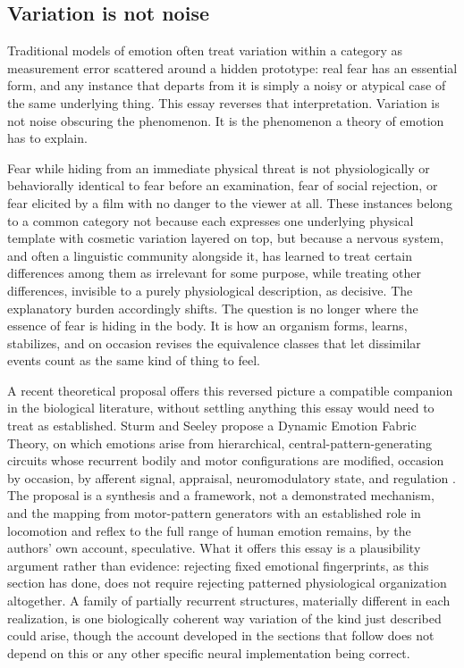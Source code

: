 \documentclass[11pt]{article}
\begin{document}
\subsection{Variation is not noise}

Traditional models of emotion often treat variation within a category as measurement error scattered around a hidden prototype: real fear has an essential form, and any instance that departs from it is simply a noisy or atypical case of the same underlying thing. This essay reverses that interpretation. Variation is not noise obscuring the phenomenon. It is the phenomenon a theory of emotion has to explain.

Fear while hiding from an immediate physical threat is not physiologically or behaviorally identical to fear before an examination, fear of social rejection, or fear elicited by a film with no danger to the viewer at all. These instances belong to a common category not because each expresses one underlying physical template with cosmetic variation layered on top, but because a nervous system, and often a linguistic community alongside it, has learned to treat certain differences among them as irrelevant for some purpose, while treating other differences, invisible to a purely physiological description, as decisive. The explanatory burden accordingly shifts. The question is no longer where the essence of fear is hiding in the body. It is how an organism forms, learns, stabilizes, and on occasion revises the equivalence classes that let dissimilar events count as the same kind of thing to feel.

A recent theoretical proposal offers this reversed picture a compatible companion in the biological literature, without settling anything this essay would need to treat as established. Sturm and Seeley propose a Dynamic Emotion Fabric Theory, on which emotions arise from hierarchical, central-pattern-generating circuits whose recurrent bodily and motor configurations are modified, occasion by occasion, by afferent signal, appraisal, neuromodulatory state, and regulation \citep{SturmSeeley2026}. The proposal is a synthesis and a framework, not a demonstrated mechanism, and the mapping from motor-pattern generators with an established role in locomotion and reflex to the full range of human emotion remains, by the authors' own account, speculative. What it offers this essay is a plausibility argument rather than evidence: rejecting fixed emotional fingerprints, as this section has done, does not require rejecting patterned physiological organization altogether. A family of partially recurrent structures, materially different in each realization, is one biologically coherent way variation of the kind just described could arise, though the account developed in the sections that follow does not depend on this or any other specific neural implementation being correct.
\end{document}
